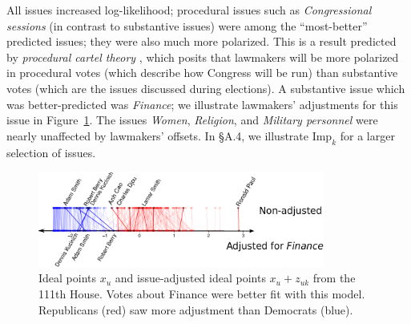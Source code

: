
All issues increased log-likelihood; procedural issues such as
\emph{Congressional sessions} (in contrast to substantive issues) were
among the ``most-better'' predicted issues; they were also much more
polarized.  This is a result predicted by \emph{procedural cartel
  theory} \cite{fenno:1965,cox:1993,cox:2002,cox:2005}, which posits
that lawmakers will be more polarized in procedural votes (which
describe how Congress will be run) than substantive votes (which are
the issues discussed during elections).  A substantive issue which was
better-predicted was \emph{Finance}; we illustrate lawmakers'
adjustments for this issue in
Figure~\ref{figure:issue_improvements_ideals}.  The issues
\emph{Women}, \emph{Religion}, and \emph{Military personnel} were
nearly unaffected by lawmakers' offsets. In \S A.4, we illustrate
$\mbox{Imp}_k$ for a larger selection of issues.

\begin{figure}[t]
 \center \includegraphics[width=0.84\textwidth,height=0.25\textwidth]{chapter_spatial_voting_with_text/figures/3393_example_ideal_points_finance.pdf}
 \vspace{-10pt}
 \small
 \caption{Ideal points $x_u$ and issue-adjusted ideal points $x_u +
   z_{uk}$ from the 111th House. Votes about Finance were better fit
   with this model.  Republicans (red) saw more adjustment than
   Democrats (blue). }
 \normalsize
  \label{figure:issue_improvements_ideals}
  \vspace{-5pt}
\end{figure}

